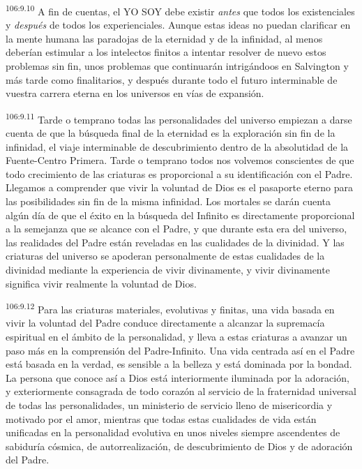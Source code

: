 \documentclass[twoside, 11pt]{book}
\begin{document}
\par
\textsuperscript{106:9.10} A fin de cuentas, el YO SOY debe existir \textit{antes} que todos los existenciales y \textit{después} de todos los experienciales. Aunque estas ideas no puedan clarificar en la mente humana las paradojas de la eternidad y de la infinidad, al menos deberían estimular a los intelectos finitos a intentar resolver de nuevo estos problemas sin fin, unos problemas que continuarán intrigándoos en Salvington y más tarde como finalitarios, y después durante todo el futuro interminable de vuestra carrera eterna en los universos en vías de expansión.

\par
\textsuperscript{106:9.11} Tarde o temprano todas las personalidades del universo empiezan a darse cuenta de que la búsqueda final de la eternidad es la exploración sin fin de la infinidad, el viaje interminable de descubrimiento dentro de la absolutidad de la Fuente-Centro Primera. Tarde o temprano todos nos volvemos conscientes de que todo crecimiento de las criaturas es proporcional a su identificación con el Padre. Llegamos a comprender que vivir la voluntad de Dios es el pasaporte eterno para las posibilidades sin fin de la misma infinidad. Los mortales se darán cuenta algún día de que el éxito en la búsqueda del Infinito es directamente proporcional a la semejanza que se alcance con el Padre, y que durante esta era del universo, las realidades del Padre están reveladas en las cualidades de la divinidad. Y las criaturas del universo se apoderan personalmente de estas cualidades de la divinidad mediante la experiencia de vivir divinamente, y vivir divinamente significa vivir realmente la voluntad de Dios.

\par
\textsuperscript{106:9.12} Para las criaturas materiales, evolutivas y finitas, una vida basada en vivir la voluntad del Padre conduce directamente a alcanzar la supremacía espiritual en el ámbito de la personalidad, y lleva a estas criaturas a avanzar un paso más en la comprensión del Padre-Infinito. Una vida centrada así en el Padre está basada en la verdad, es sensible a la belleza y está dominada por la bondad. La persona que conoce así a Dios está interiormente iluminada por la adoración, y exteriormente consagrada de todo corazón al servicio de la fraternidad universal de todas las personalidades, un ministerio de servicio lleno de misericordia y motivado por el amor, mientras que todas estas cualidades de vida están unificadas en la personalidad evolutiva en unos niveles siempre ascendentes de sabiduría cósmica, de autorrealización, de descubrimiento de Dios y de adoración del Padre.
\end{document}
